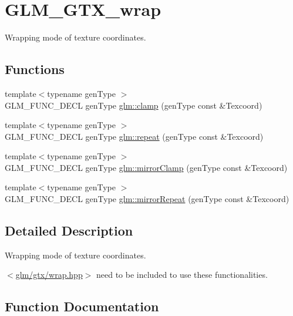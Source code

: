 \hypertarget{group__gtx__wrap}{}\section{G\+L\+M\+\_\+\+G\+T\+X\+\_\+wrap}
\label{group__gtx__wrap}


Wrapping mode of texture coordinates.  


\subsection*{Functions}
\begin{DoxyCompactItemize}
\item 
{\footnotesize template$<$typename gen\+Type $>$ }\\G\+L\+M\+\_\+\+F\+U\+N\+C\+\_\+\+D\+E\+CL gen\+Type \hyperlink{group__gtx__wrap_ga6c0cc6bd1d67ea1008d2592e998bad33}{glm\+::clamp} (gen\+Type const \&Texcoord)
\item 
{\footnotesize template$<$typename gen\+Type $>$ }\\G\+L\+M\+\_\+\+F\+U\+N\+C\+\_\+\+D\+E\+CL gen\+Type \hyperlink{group__gtx__wrap_ga809650c6310ea7c42666e918c117fb6f}{glm\+::repeat} (gen\+Type const \&Texcoord)
\item 
{\footnotesize template$<$typename gen\+Type $>$ }\\G\+L\+M\+\_\+\+F\+U\+N\+C\+\_\+\+D\+E\+CL gen\+Type \hyperlink{group__gtx__wrap_gaa6856a0a048d2749252848da35e10c8b}{glm\+::mirror\+Clamp} (gen\+Type const \&Texcoord)
\item 
{\footnotesize template$<$typename gen\+Type $>$ }\\G\+L\+M\+\_\+\+F\+U\+N\+C\+\_\+\+D\+E\+CL gen\+Type \hyperlink{group__gtx__wrap_ga16a89b0661b60d5bea85137bbae74d73}{glm\+::mirror\+Repeat} (gen\+Type const \&Texcoord)
\end{DoxyCompactItemize}


\subsection{Detailed Description}
Wrapping mode of texture coordinates. 

$<$\hyperlink{wrap_8hpp}{glm/gtx/wrap.\+hpp}$>$ need to be included to use these functionalities. 

\subsection{Function Documentation}
\mbox{\label{group__gtx__wrap_ga6c0cc6bd1d67ea1008d2592e998bad33}} 
